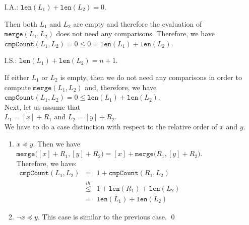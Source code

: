 \begin{enumerate}
\item[I.A.:] $\texttt{len}(L_1) + \texttt{len}(L_2) = 0$.

             Then both $L_1$ and $L_2$ are empty and therefore the evaluation of
             $\mathtt{merge}(L_1, L_2)$ does not need any comparisons.  Therefore, we have 
             \\[0.2cm]
             \hspace*{1.3cm}
             $\mathtt{cmpCount}(L_1, L_2) = 0 \leq 0 = \texttt{len}(L_1) + \texttt{len}(L_2)$.
\item[I.S.:] $\texttt{len}(L_1) + \texttt{len}(L_2) = n+1$.

             If either $L_1$ or $L_2$ is empty, then we do not need any comparisons in order to
             compute $\mathtt{merge}(L_1, L_2)$ and, therefore, we have
             \\[0.2cm]
             \hspace*{1.3cm}
             $\mathtt{cmpCount}(L_1,L_2) = 0 \leq \texttt{len}(L_1) + \texttt{len}(L_2)$.
             \\[0.2cm]
             Next, let us assume that \\[0.2cm]
             \hspace*{1.3cm} $L_1 = [x] + R_1$ \quad and \quad $L_2 = [y] + R_2$.
             \\[0.2cm]
             We have to do a case distinction with respect to the relative order of $x$ and $y$.
             \begin{enumerate}
             \item $x \preceq y$.  Then we have \\[0.2cm]
                   \hspace*{1.3cm} 
                   $\mathtt{merge}\bigl([x] + R_1, [y] + R_2\bigr) = [x] + \mathtt{merge}\bigl(R_1, [y] + R_2\bigr)$. 
                   \\[0.2cm]
                   Therefore, we have:
                   \\[0.2cm]
                   \hspace*{1.3cm}
                   $
                   \begin{array}{lcl}
                    \mathtt{cmpCount}(L_1, L_2) & = & 1 + \mathtt{cmpCount}(R_1, L_2) \\[0.2cm]
                                               & \stackrel{ih}{\leq} & 1 + \texttt{len}(R_1) + \texttt{len}(L_2) \\[0.2cm]
                                               & = & \texttt{len}(L_1) + \texttt{len}(L_2)
                   \end{array}
                   $
                   \\[0.2cm]
                   \item $\neg x \preceq y$.  This case is similar to the previous case. 
                   \qed
             \end{enumerate}
\end{enumerate}
